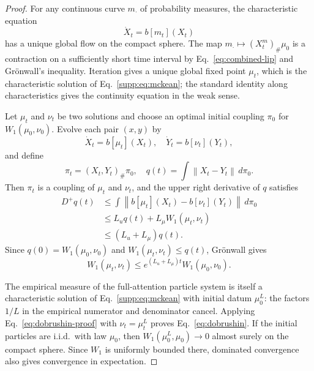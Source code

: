 \documentclass[11pt]{article}
\newcommand{\norm}[1]{\left\lVert #1 \right\rVert}
\begin{document}
\begin{proof}
For any continuous curve $m_\cdot$ of probability measures, the
characteristic equation
\begin{equation}
\dot X_t=b[m_t](X_t)
\end{equation}
has a unique global flow on the compact sphere. The map
$m_\cdot\mapsto(X_t^m)_\#\mu_0$ is a contraction on a sufficiently short
time interval by Eq.~\eqref{eq:combined-lip} and Gr\"onwall's inequality.
Iteration gives a unique global fixed point $\mu_t$, which is the
characteristic solution of Eq.~\eqref{supp:eq:mckean}; the standard identity along
characteristics gives the continuity equation in the weak sense.

Let $\mu_t$ and $\nu_t$ be two solutions and choose an optimal initial coupling
$\pi_0$ for $W_1(\mu_0,\nu_0)$. Evolve each pair $(x,y)$ by
\begin{equation}
\dot X_t=b[\mu_t](X_t),
\quad
\dot Y_t=b[\nu_t](Y_t),
\end{equation}
and define
\begin{equation}
\pi_t=(X_t,Y_t)_\#\pi_0,
\quad
q(t)=\int\norm{X_t-Y_t}\,d\pi_0.
\end{equation}
Then $\pi_t$ is a coupling of $\mu_t$ and $\nu_t$, and the upper right
derivative of $q$ satisfies
\begin{align}
D^+q(t)
&\le\int\norm{b[\mu_t](X_t)-b[\nu_t](Y_t)}\,d\pi_0\\
&\le L_uq(t)+L_\mu W_1(\mu_t,\nu_t)\\
&\le(L_u+L_\mu)q(t).
\end{align}
Since $q(0)=W_1(\mu_0,\nu_0)$ and $W_1(\mu_t,\nu_t)\le q(t)$, Gr\"onwall gives
\begin{equation}
W_1(\mu_t,\nu_t)
\le e^{(L_u+L_\mu)t}W_1(\mu_0,\nu_0).
\label{eq:dobrushin-proof}
\end{equation}

The empirical measure of the full-attention particle system is itself a
characteristic solution of Eq.~\eqref{supp:eq:mckean} with initial datum $\mu_0^L$:
the factors $1/L$ in the empirical numerator and denominator cancel. Applying
Eq.~\eqref{eq:dobrushin-proof} with $\nu_t=\mu_t^L$ proves
Eq.~\eqref{eq:dobrushin}. If the initial particles are i.i.d.\ with law $\mu_0$,
then $W_1(\mu_0^L,\mu_0)\to0$ almost surely on the compact sphere. Since $W_1$
is uniformly bounded there, dominated convergence also gives convergence in
expectation.
\end{proof}
\end{document}
